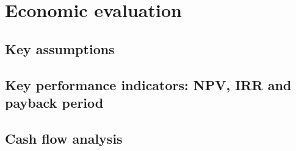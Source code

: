\section{Economic evaluation}
\subsection{Key assumptions}
\subsection{Key performance indicators: NPV, IRR and payback period}
\subsection{Cash flow analysis}
